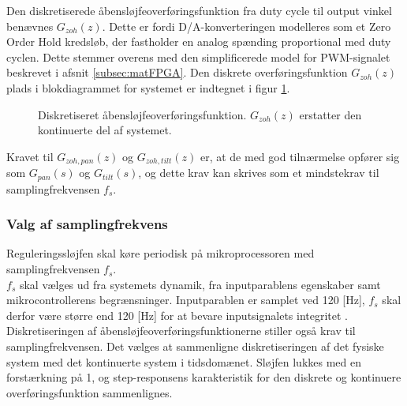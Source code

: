 Den diskretiserede åbensløjfeoverføringsfunktion fra duty cycle til output vinkel
benævnes \(G_{zoh}\left(z\right)\). Dette er fordi D/A-konverteringen modelleres som et Zero Order Hold kredsløb,
der fastholder en analog spænding proportional med duty cyclen. Dette stemmer overens med den simplificerede
model for PWM-signalet beskrevet i afsnit \ref{subsec:matFPGA}.
Den diskrete overføringsfunktion \(G_{zoh}\left(z\right)\) plads i blokdiagrammet for systemet
er indtegnet i figur \ref{fig:digitalkontroller3}.
\begin{figure}[!th]
\centering
\begin{tikzpicture}[scale=0.9, every node/.style={scale=0.9}, node distance=2.6cm, =>latex']

\end{tikzpicture}
\caption[Diskretiseret åbensløjfeoverføringsfunktion]
		{Diskretiseret åbensløjfeoverføringsfunktion.
		\(G_{zoh}\left(z\right)\) erstatter den kontinuerte del af systemet.}
\label{fig:digitalkontroller3}
\end{figure}

Kravet til \(G_{zoh,pan}\left(z\right)\) og \(G_{zoh,tilt}\left(z\right)\) er, at de
med god tilnærmelse opfører sig som \(G_{pan}\left(s\right)\) og \(G_{tilt}\left(s\right)\),
og dette krav kan skrives som et mindstekrav til samplingfrekvensen \(f_s\).

\subsubsection{Valg af samplingfrekvens}\label{subsec:choosefs}
Reguleringssløjfen skal køre periodisk på mikroprocessoren
med samplingfrekvensen \(f_s\). \\
\(f_s\) skal vælges
ud fra systemets dynamik,
fra inputparablens egenskaber samt 
mikrocontrollerens begrænsninger. 
Inputparablen er samplet ved 120 [Hz], 
\(f_s\) skal derfor være større end 120 [Hz] for at bevare inputsignalets integritet \citep[s. 17]{dsp}. 
Diskretiseringen af åbensløjfeoverføringsfunktionerne stiller også krav til samplingfrekvensen.
Det vælges at sammenligne diskretiseringen af det fysiske system med det kontinuerte system i tidsdomænet.
Sløjfen lukkes med en forstærkning på 1, 
og step-responsens karakteristik for den diskrete og kontinuere overføringsfunktion sammenlignes. 

